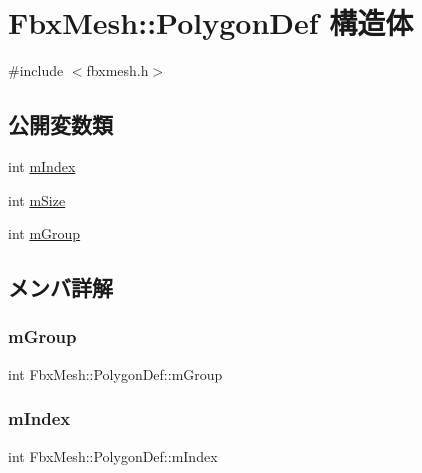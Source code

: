 \hypertarget{struct_fbx_mesh_1_1_polygon_def}{}\section{Fbx\+Mesh\+:\+:Polygon\+Def 構造体}
\label{struct_fbx_mesh_1_1_polygon_def}


{\ttfamily \#include $<$fbxmesh.\+h$>$}

\subsection*{公開変数類}
\begin{DoxyCompactItemize}
\item 
int \hyperlink{struct_fbx_mesh_1_1_polygon_def_af511988f3d8e9db28dda49efeb75cd94}{m\+Index}
\item 
int \hyperlink{struct_fbx_mesh_1_1_polygon_def_a77222b3c2e42261e765b21a871c4c066}{m\+Size}
\item 
int \hyperlink{struct_fbx_mesh_1_1_polygon_def_ae413c624e60c217fc94e4801c6ee7440}{m\+Group}
\end{DoxyCompactItemize}


\subsection{メンバ詳解}
\mbox{\label{struct_fbx_mesh_1_1_polygon_def_ae413c624e60c217fc94e4801c6ee7440}} 
\subsubsection{\texorpdfstring{m\+Group}{mGroup}}
{\footnotesize\ttfamily int Fbx\+Mesh\+::\+Polygon\+Def\+::m\+Group}

\mbox{\label{struct_fbx_mesh_1_1_polygon_def_af511988f3d8e9db28dda49efeb75cd94}} 
\subsubsection{\texorpdfstring{m\+Index}{mIndex}}
{\footnotesize\ttfamily int Fbx\+Mesh\+::\+Polygon\+Def\+::m\+Index}


